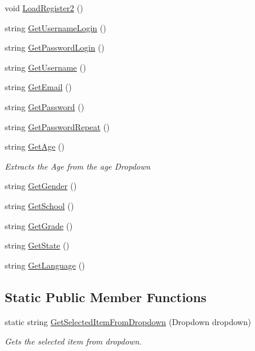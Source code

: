 \begin{DoxyCompactItemize}
void \hyperlink{classRegisterController_a6a4d488534b263f16c741b920f7e3543}{Load\+Register2} ()
\item 
string \hyperlink{classRegisterController_ab69e503f3a5fbf2474abd32dad6a071f}{Get\+Username\+Login} ()
\item 
string \hyperlink{classRegisterController_a96881a003ae56e420a67436e60f27ab8}{Get\+Password\+Login} ()
\item 
string \hyperlink{classRegisterController_a9c65087784b926a7bfa3883cd7df74df}{Get\+Username} ()
\item 
string \hyperlink{classRegisterController_a3e017e31a84c05fd55855b80ee4bf082}{Get\+Email} ()
\item 
string \hyperlink{classRegisterController_a95b354b8d1933b87bcedd25994edbc3f}{Get\+Password} ()
\item 
string \hyperlink{classRegisterController_a10550f3ccac168ab1edde3e0dab6fb30}{Get\+Password\+Repeat} ()
\item 
string \hyperlink{classRegisterController_a9a6a8e029ed5a644c8fe2048b96e2121}{Get\+Age} ()
\begin{DoxyCompactList}\small\item\em Extracts the Age from the age Dropdown \end{DoxyCompactList}\item 
string \hyperlink{classRegisterController_a5b1fb947518fb240ed183733551750ab}{Get\+Gender} ()
\item 
string \hyperlink{classRegisterController_a9d045a715368cfde9b97eaacf0a2088f}{Get\+School} ()
\item 
string \hyperlink{classRegisterController_a7f1027ff167a61b09727736607bbe1a0}{Get\+Grade} ()
\item 
string \hyperlink{classRegisterController_a8f676337877ac8e82fd695c7cf7d38fb}{Get\+State} ()
\item 
string \hyperlink{classRegisterController_a5473dbdd4bf42009c9f51cb1be7b160d}{Get\+Language} ()
\end{DoxyCompactItemize}
\subsection*{Static Public Member Functions}
\begin{DoxyCompactItemize}
\item 
static string \hyperlink{classRegisterController_a3c58d07f9660dbeddd5bd41edcd4dcc3}{Get\+Selected\+Item\+From\+Dropdown} (Dropdown dropdown)
\begin{DoxyCompactList}\small\item\em Gets the selected item from dropdown. \end{DoxyCompactList}\end{DoxyCompactItemize}
